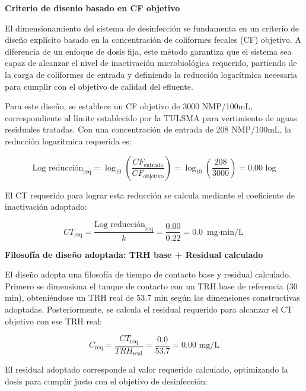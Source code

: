 \documentclass[12pt,a4paper]{article}
\begin{document}
\textbf{Criterio de disenio basado en CF objetivo}

El dimensionamiento del sistema de desinfección se fundamenta en un criterio de diseño explícito basado en la concentración de coliformes fecales (CF) objetivo. A diferencia de un enfoque de dosis fija, este método garantiza que el sistema sea capaz de alcanzar el nivel de inactivación microbiológica requerido, partiendo de la carga de coliformes de entrada y definiendo la reducción logarítmica necesaria para cumplir con el objetivo de calidad del efluente.

Para este diseño, se establece un CF objetivo de 3000 NMP/100mL, correspondiente al límite establecido por la TULSMA para vertimiento de aguas residuales tratadas. Con una concentración de entrada de 208 NMP/100mL, la reducción logarítmica requerida es:

\begin{equation}
\text{Log reducción}_{\text{req}} = \log_{10}\left(\frac{CF_{\text{entrada}}}{CF_{\text{objetivo}}}\right) = \log_{10}\left(\frac{208}{3000}\right) = 0.00 \text{ log}
\end{equation}

El CT requerido para lograr esta reducción se calcula mediante el coeficiente de inactivación adoptado:

\begin{equation}
CT_{\text{req}} = \frac{\text{Log reducción}_{\text{req}}}{k} = \frac{0.00}{0.22} = 0.0 \text{ mg$\cdot$min/L}
\end{equation}

\textbf{Filosofía de diseño adoptada: TRH base + Residual calculado}

El diseño adopta una filosofía de tiempo de contacto base y residual calculado. Primero se dimensiona el tanque de contacto con un TRH base de referencia (30 min), obteniéndose un TRH real de 53.7 min según las dimensiones constructivas adoptadas. Posteriormente, se calcula el residual requerido para alcanzar el CT objetivo con ese TRH real:

\begin{equation}
C_{\text{req}} = \frac{CT_{\text{req}}}{TRH_{\text{real}}} = \frac{0.0}{53.7} = 0.00 \text{ mg/L}
\end{equation}

El residual adoptado corresponde al valor requerido calculado, optimizando la dosis para cumplir justo con el objetivo de desinfección:
\end{document}
